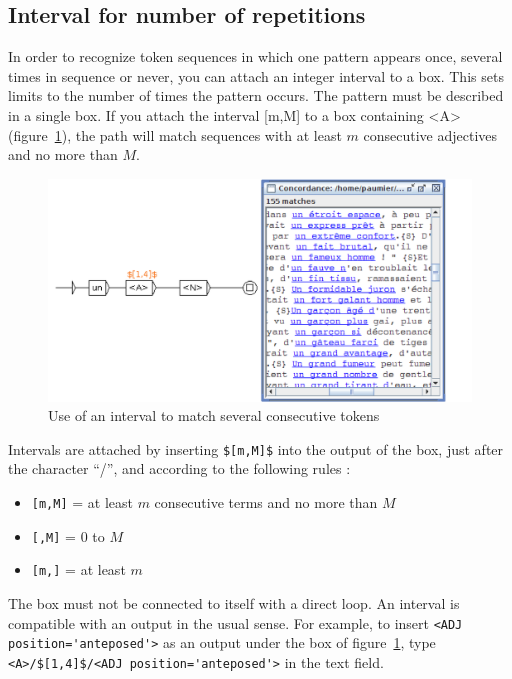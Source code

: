 \subsection{Interval for number of repetitions}
\label{nb-repetitions}
\noindent In order to recognize token sequences in which one pattern appears once, several times in sequence or never, you can attach an integer interval to a box. This sets limits to the number of times the pattern occurs. The pattern must be described in a single box.
If you attach the interval [m,M] to a box containing <A> (figure~\ref{intervals}), the path will match sequences with at least $m$ consecutive adjectives and no more than $M$.

\begin{figure}[h!]
\begin{center}
\includegraphics[width=13.5cm]{resources/img/fig6-10a.png}
\caption{Use of an interval to match several consecutive tokens\label{intervals}}
\end{center}
\end{figure}

\noindent Intervals are attached by inserting \verb+$[m,M]$+ into the output of the box, just after the character ``/'', and according to the following rules : 
\begin{itemize}
\item \verb+[m,M]+ = at least $m$ consecutive terms and no more than $M$
\item \verb+[,M]+ = 0 to $M$  
\item \verb+[m,]+ = at least $m$
\end{itemize}

\noindent  The box must not be connected to itself with a direct loop. An interval is compatible with an output in the usual sense. For example, to insert \verb+<ADJ position='anteposed'>+  as an output under the box of figure~\ref{intervals}, type \verb+<A>/$[1,4]$/<ADJ position='anteposed'>+ in the text field. 

